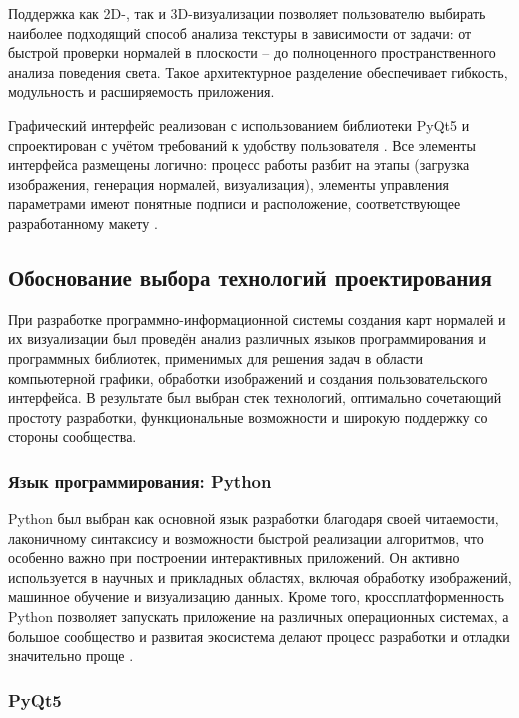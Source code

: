 Поддержка как 2D-, так и 3D-визуализации позволяет пользователю выбирать наиболее подходящий способ анализа текстуры в зависимости от задачи: от быстрой проверки нормалей в плоскости -- до полноценного пространственного анализа поведения света. Такое архитектурное разделение обеспечивает гибкость, модульность и расширяемость приложения.

Графический интерфейс реализован с использованием библиотеки PyQt5 и спроектирован с учётом требований к удобству пользователя \cite{prokhorenok2021}. Все элементы интерфейса размещены логично: процесс работы разбит на этапы (загрузка изображения, генерация нормалей, визуализация), элементы управления параметрами имеют понятные подписи и расположение, соответствующее разработанному макету \cite{cooper2020}.
\subsection{Обоснование выбора технологий проектирования}

При разработке программно-информационной системы создания карт нормалей и их визуализации был проведён анализ различных языков программирования и программных библиотек, применимых для решения задач в области компьютерной графики, обработки изображений и создания пользовательского интерфейса. В результате был выбран стек технологий, оптимально сочетающий простоту разработки, функциональные возможности и широкую поддержку со стороны сообщества.
\subsubsection{Язык программирования: Python}

Python был выбран как основной язык разработки благодаря своей читаемости, лаконичному синтаксису и возможности быстрой реализации алгоритмов, что особенно важно при построении интерактивных приложений. Он активно используется в научных и прикладных областях, включая обработку изображений, машинное обучение и визуализацию данных. Кроме того, кроссплатформенность Python позволяет запускать приложение на различных операционных системах, а большое сообщество и развитая экосистема делают процесс разработки и отладки значительно проще \cite{ravichandiran2020}.
\subsubsection{PyQt5}

